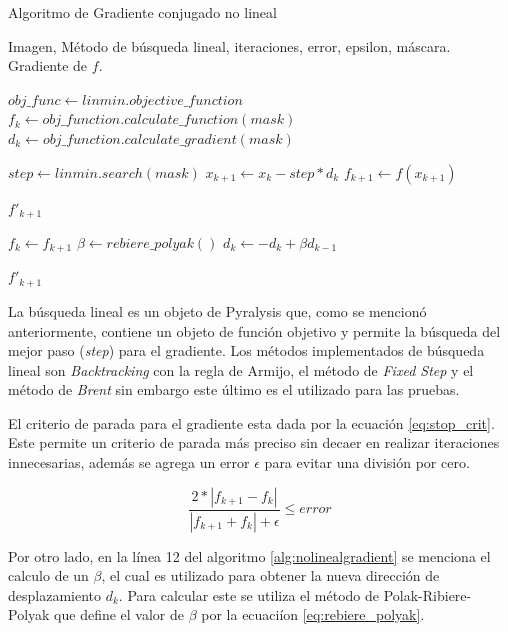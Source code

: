 \begin{algorithm}[!ht]
	\caption{Algoritmo de Gradiente conjugado no lineal}
	\label{alg:nolinealgradient}
	\begin{algorithmic}[1]
	\REQUIRE Imagen, Método de búsqueda lineal, iteraciones, error, epsilon, máscara. 
	\ENSURE Gradiente de $f$. 

    \STATE $obj\_func \gets linmin.objective\_function$
    \STATE $f_{k} \gets obj\_function.calculate\_function(mask)$
    \STATE $d_{k} \gets obj\_function.calculate\_gradient(mask)$
	
        \STATE $step \gets linmin.search(mask)$
        \STATE $x_{k+1} \gets x_{k} - step * d_{k}$
        \STATE $f_{k+1} \gets f(x_{k+1})$

         \RETURN $f'_{k+1}$
        \ENDIF

        \STATE $f_{k} \gets f_{k+1}$
        \STATE $\beta \gets rebiere\_polyak()$
        \STATE $d_{k} \gets -d_{k} + \beta d_{k-1}$
	\ENDFOR
	
	\RETURN $f'_{k+1}$
	
	\end{algorithmic}
\end{algorithm}

La búsqueda lineal es un objeto de Pyralysis que, como se mencionó anteriormente, contiene un objeto de función objetivo y permite la búsqueda del mejor paso (\textit{step}) para el gradiente. Los métodos implementados de búsqueda lineal son \textit{Backtracking} con la regla de Armijo, el método de \textit{Fixed Step} y  el método de \textit{Brent} sin embargo este último es el utilizado para las pruebas.  

El criterio de parada para el gradiente esta dada por la ecuación \ref{eq:stop_crit}. Este permite un criterio de parada más preciso sin decaer en realizar iteraciones innecesarias, además se agrega un error $\epsilon$ para evitar una división por cero. 

\begin{equation}
    \label{eq:stop_crit}
    \frac{ 2*|f_{k+1} - f_{k}|}{|f_{k+1} + f_{k}| + \epsilon}\leqslant error  
\end{equation}

Por otro lado, en la línea 12 del algoritmo \ref{alg:nolinealgradient} se menciona el calculo de un $\beta$, el cual es utilizado para obtener la nueva dirección de desplazamiento $d_{k}$. Para calcular este se utiliza el método de Polak-Ribiere-Polyak que define el valor de $\beta$ por la ecuaciíon \ref{eq:rebiere_polyak}.

